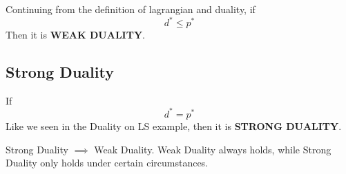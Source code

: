 \begin{definition}
	Continuing from the definition of lagrangian and duality, if
	\[
d^*\le p^*
	\]
	Then it is \textbf{WEAK DUALITY}.
\end{definition}


\subsection{Strong Duality} %
\label{sub:strong_duality}

\begin{definition}
	If
	\[
d^*= p^*
	\]
	Like we seen in the Duality on LS example, then it is \textbf{STRONG DUALITY}.
\end{definition}

\begin{remark}
	Strong Duality $\implies$ Weak Duality. Weak Duality always holds, while Strong Duality only holds under certain circumstances.
\end{remark}


